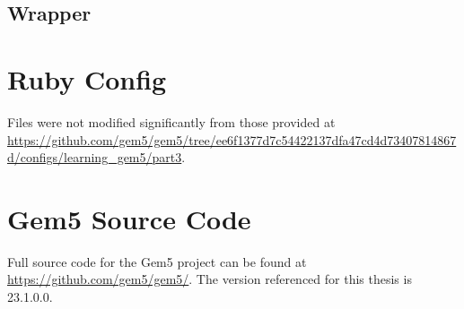 \documentclass[12pt,twoside]{reedthesis}
\newcommand{\vstep}{\vspace{5mm}}
\begin{document}
\subsection*{Wrapper}

\vstep

\section{Ruby Config}

Files were not modified significantly from those provided at \url{https://github.com/gem5/gem5/tree/ee6f1377d7c54422137dfa47cd4d73407814867d/configs/learning_gem5/part3}.

\section{Gem5 Source Code}

Full source code for the Gem5 project can be found at \url{https://github.com/gem5/gem5/}. The version referenced for this thesis is 23.1.0.0.

\nocite{*}
\printbibliography[title=References]
\end{document}
